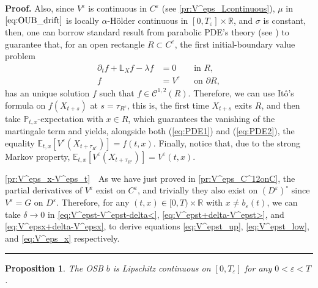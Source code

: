 \documentclass{tufte-handout}
\newcommand{\E}{\mathbb{E}} %
\renewcommand{\Pr}{\mathbb{P}} %
\newcommand{\R}{\mathbb{R}} %
\newtheorem{pr}{Proposition}
\newenvironment{pf}[1][Proof]{\textbf{#1.} }{\ \rule{0.5em}{0.5em}}
\begin{document}
\begin{pf}
		Also, since $V^\varepsilon$ is continuous in $C^\varepsilon$ (see \ref{pr:V^eps_Lcontinuous}), $\mu$ in $\eqref{eq:OUB_drift}$ is locally $\alpha$-Hölder continuous in $[0, T_\varepsilon]\times\R$, and $\sigma$ is constant, then, one can borrow standard result from parabolic PDE's theory (see \citet[Section 3, Theorem 9]{friedman1964partial}) to guarantee that, for an open rectangle $R\subset C^\varepsilon$, the first initial-boundary value problem
		\begin{align}
		\partial_t f + \mathbb{L}_{X} f - \lambda f &= 0 && \text{in } R, \label{eq:PDE1} \\
		f &= V^\varepsilon && \text{on } \partial R, \label{eq:PDE2}
		\end{align}
		has an unique solution $f$ such that $f\in \mathcal{C}^{1, 2}(R)$. Therefore, we can use Itô's formula on $f(X_{t + s})$ at $s = \tau_{R^c}$, this is, the first time $X_{t + s}$ exits $R$, and then take $\Pr_{t, x}$-expectation with $x \in R$, which guarantees the vanishing of the martingale term and yields, alongside both (\ref{eq:PDE1}) and (\ref{eq:PDE2}), the equality $\E_{t, x}[V^\varepsilon(X_{t + \tau_{R^c}})] = f(t, x)$. Finally, notice that, due to the strong Markov property, $\E_{t, x}[V^\varepsilon(X_{t + \tau_{R^c}})] = V^\varepsilon(t, x)$.
		\vspace{0.3cm}
		
		\ref{pr:V^eps_x-V^eps_t}\ \ As we have just proved in \ref{pr:V^eps_C^12onC}, the partial derivatives of $V^\varepsilon$ exist on $C^\varepsilon$, and trivially they also exist on $\left(D^\varepsilon\right)^{\circ}$ since $V^\varepsilon = G$ on $D^\varepsilon$. Therefore, for any $(t, x)\in [0, T)\times \R$ with $x\neq b_\varepsilon(t)$, we can take $\delta\rightarrow 0$ in \eqref{eq:V^epst-V^epst-delta<}, \eqref{eq:V^epst+delta-V^epst>}, and \eqref{eq:V^epsx+delta-V^epsx}, to derive equations \eqref{eq:V^epst_up}, \eqref{eq:V^epst_low}, and \eqref{eq:V^eps_x} respectively.	
	\end{pf}
	
	
	\begin{pr}\label{pr:OSB_LC_OUB}
		The OSB $b$ is Lipschitz continuous on $[0, T_\varepsilon]$ for any $0 < \varepsilon < T$.
	\end{pr}
	
\end{document}
